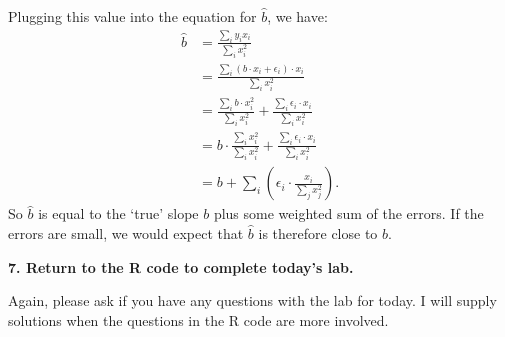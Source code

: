 \documentclass[12pt,hidelinks]{article}
\numberwithin{equation}{section}
\begin{document}
Plugging this value into the equation for $\widehat{b}$, we have:
\begin{align*}
\widehat{b} &= \frac{\sum_i y_i x_i}{\sum_i x_i^2} \\
&= \frac{\sum_i (b \cdot x_i + \epsilon_i) \cdot x_i}{\sum_i x_i^2} \\
&= \frac{\sum_i b \cdot x_i^2}{\sum_i x_i^2} + \frac{\sum_i \epsilon_i \cdot x_i}{\sum_i x_i^2} \\
&= b \cdot \frac{\sum_i x_i^2}{\sum_i x_i^2} + \frac{\sum_i \epsilon_i \cdot x_i}{\sum_i x_i^2} \\
&= b + \sum_i \left( \epsilon_i \cdot \frac{x_i}{\sum_j x_j^2} \right).
\end{align*}
So $\widehat{b}$ is equal to the `true' slope $b$ plus some weighted sum of
the errors. If the errors are small, we would expect that $\widehat{b}$ is
therefore close to $b$.

\vspace*{12pt}

\textbf{7. Return to the R code to complete today's lab.}

\vspace*{12pt}

Again, please ask if you have any questions with the lab for today. I will
supply solutions when the questions in the R code are more involved.
\end{document}
